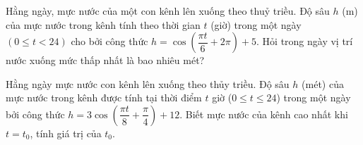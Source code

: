 \begin{bt}%

	Hằng ngày, mực nước của một con kênh lên xuống theo thuỷ triều. Độ sâu $h$ (m) của mực nước trong kênh tính theo thời gian $t$ (giờ) trong một ngày $(0 \leq t<24)$ cho bởi công thức $h=\cos \left(\dfrac{\pi t}{6}+2 \pi\right)+5$. Hỏi trong ngày vị trí nước xuống mức thấp nhất là bao nhiêu mét?
\end{bt}

\begin{bt}%
	Hằng ngày mực nước con kênh lên xuống theo thủy triều. Độ sâu $ h$ (mét) của mực nước trong kênh được tính tại thời điểm $t$ giờ ($0\le t\le24$) trong một ngày bởi công thức $ h=3\cos\left(\dfrac{\pi t}{8}+\dfrac{\pi}{4}\right)+12$. Biết mực nước của kênh cao nhất khi $t=t_0$, tính giá trị của $t_0$.
\end{bt}


